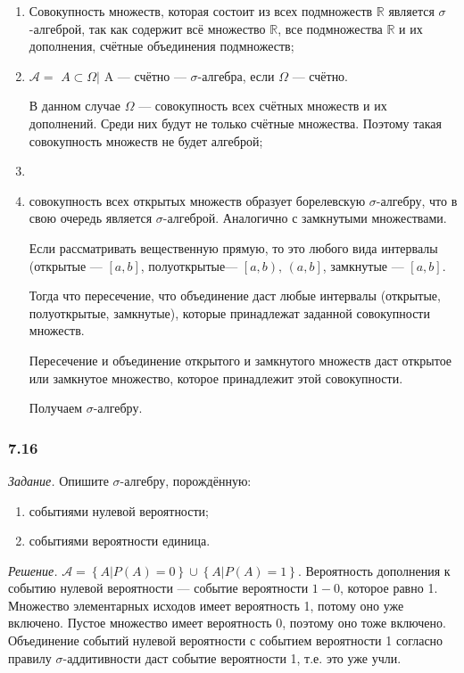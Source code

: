\begin{enumerate}[label=\alph*)]
\item Совокупность множеств, которая состоит из всех подмножеств $ \mathbb{R} $ является $ \sigma $-алгеброй, так как содержит всё множество $ \mathbb{R} $, все подмножества $ \mathbb{R} $ и их дополнения, счётные объединения подмножеств;
\item $ \mathcal{A} =$ {$ \left. A \subset \Omega \right| $ A --- счётно} --- $ \sigma $-алгебра, если $ \Omega $ --- счётно.

В данном случае $ \Omega $ --- совокупность всех счётных множеств и их дополнений.
Среди них будут не только счётные множества.
Поэтому такая совокупность множеств не будет алгеброй;
\item \item совокупность всех открытых множеств образует борелевскую $ \sigma $-алгебру, что в свою очередь является $ \sigma $-алгеброй.
Аналогично с замкнутыми множествами.

Если рассматривать вещественную прямую,
то это любого вида интервалы (открытые ---
$ \left[ a, b \right] $, полуоткрытые--- $\left[ a, b \right), \, \left( a, b \right] $, замкнутые --- $ \left[ a, b \right] $.

Тогда что пересечение, что объединение даст любые интервалы (открытые, полуоткрытые, замкнутые),
которые принадлежат заданной совокупности множеств.

Пересечение и объединение открытого и замкнутого множеств даст открытое или замкнутое множество, которое принадлежит этой совокупности.

Получаем $ \sigma $-алгебру.
\end{enumerate}

\subsubsection*{7.16}

\textit{Задание.} Опишите $ \sigma $-алгебру, порождённую:
\begin{enumerate}[label=\alph*)]
\item событиями нулевой вероятности;
\item событиями вероятности единица.
\end{enumerate}

\textit{Решение.} $ \mathcal{A} = \left\{ \left. A \right| P \left( A \right) = 0 \right\} \cup \left\{ \left. A \right| P \left( A \right) = 1 \right\} $.
Вероятность дополнения к событию нулевой вероятности --- событие вероятности $1 - 0$, которое равно 1.
Множество элементарных исходов имеет вероятность 1, потому оно уже включено.
Пустое множество имеет вероятность 0, поэтому оно тоже включено.
Объединение событий нулевой вероятности с событием вероятности 1 согласно правилу $ \sigma $-аддитивности даст событие вероятности 1, т.е. это уже учли.

